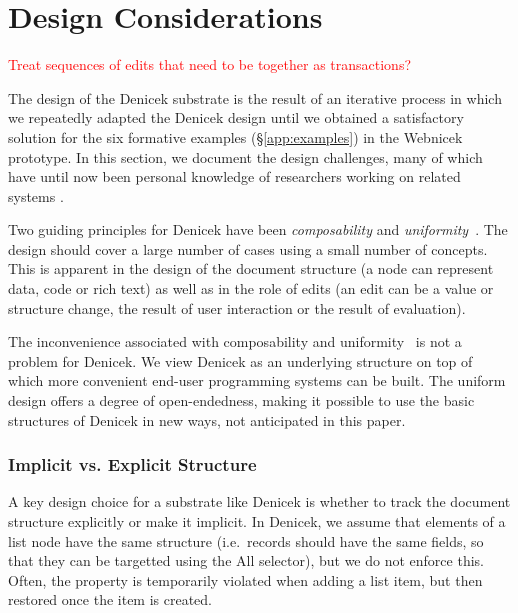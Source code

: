 \documentclass[sigconf,anonymous,screen]{acmart}
\newcommand{\ident}[1]{{\sffamily #1}}
\newcommand{\note}[1]{\textcolor{red}{#1}}
\begin{document}

\section{Design Considerations}
\label{sec:discuss}

\note{Treat sequences of edits that need to be together as transactions?}

The design of the Denicek substrate is the result of an iterative process in which we repeatedly
adapted the Denicek design until we obtained a satisfactory solution for the six formative examples
(\S\ref{app:examples}) in the Webnicek prototype. In this section, we document the design challenges,
many of which have until now been personal knowledge of researchers working on related
systems \cite{jakubovic-2022-ladder,edwards-2005-subtext,hall-2017-infra,omar-2021-livelits}.

Two guiding principles for Denicek have been \emph{composability} and
\emph{uniformity}~\cite{jakubovic-2023-techdims}. The design should cover a large number of
cases using a small number of concepts. This is apparent in the design of the document
structure (a node can represent data, code or rich text) as well as in the role of edits
(an edit can be a value or structure change, the result of user interaction or the
result of evaluation).

The inconvenience associated with composability and uniformity~\cite{jakubovic-2023-techdims} is not
a problem for Denicek. We view Denicek as an underlying structure on top of which more
convenient end-user programming systems can be built. The uniform design offers a degree of open-endedness,
making it possible to use the basic structures of Denicek in new ways, not anticipated in this paper.

\subsubsection*{Implicit vs. Explicit Structure}
A key design choice for a substrate like Denicek is whether to track the document structure
explicitly or make it implicit. In Denicek, we assume that elements of a list node have the same
structure (i.e.~records should have the same fields, so that they can be targetted using the \ident{All}
selector), but we do not enforce this. Often, the property is temporarily violated when adding a
list item, but then restored once the item is created.
\end{document}
